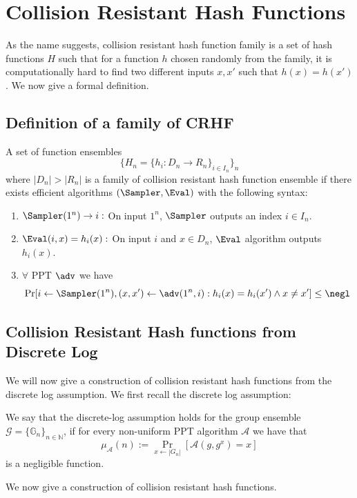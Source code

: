 \section{Collision Resistant Hash Functions}

As the name suggests, collision resistant hash function family is a set of hash functions $H$ such that for a function $h$ chosen randomly from the family, it is computationally hard to find two different inputs $x,x'$ such that $h(x) = h(x')$. We now give a formal definition.

\subsection{Definition of a family of CRHF}

A set of function ensembles
\[ \{H_n = \{h_i : D_n \to R_n \}_{i \in I_n} \}_n\]
where $|D_n| > |R_n|$ is a family of collision resistant hash function ensemble if there exists efficient algorithms $(\Sampler,\Eval)$ with the following syntax:
\begin{enumerate}
\item $\Sampler(1^n) \to i:$ On input $1^n$, $\Sampler$ outputs an index $i \in I_n$.
\item $\Eval(i,x) = h_i(x):$ On input $i$ and $x \in D_n$, $\Eval$ algorithm outputs $h_i(x)$. 
\item $\forall$ PPT $\adv$ we have
\[\Pr[i \gets \Sampler(1^n), (x,x') \gets \adv(1^n,i) : h_i(x) = h_i(x') \wedge x \neq x'] \leq \negl\]
\end{enumerate}


\subsection{Collision Resistant Hash functions from Discrete Log}
We will now give a construction of collision resistant hash functions from the discrete log assumption. We first recall the discrete log assumption:
\begin{definition}
We say that the discrete-log assumption holds for the group ensemble $\mathcal{G} =\{ \mathbb{G}_n\}_{n \in \mathbb{N}}$, if for every non-uniform PPT algorithm $\mathcal{A}$ we have that
\[\mu_\mathcal{A}(n) := \Pr_{x \leftarrow |G_n|}[\mathcal{A}(g,g^x) = x]\]
is a negligible function.
\end{definition}

We now give a construction of collision resistant hash functions.  

